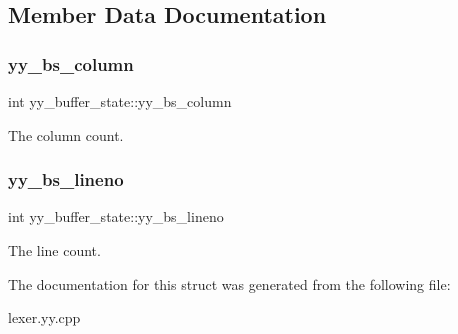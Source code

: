 \subsection{Member Data Documentation}
\mbox{\label{structyy__buffer__state_a10c4fcd8be759e6bf11e6d3e8cdb0307}} 
\subsubsection{\texorpdfstring{yy\+\_\+bs\+\_\+column}{yy\_bs\_column}}
{\footnotesize\ttfamily int yy\+\_\+buffer\+\_\+state\+::yy\+\_\+bs\+\_\+column}

The column count. \mbox{\label{structyy__buffer__state_a818e94bc9c766e683c60df1e9fd01199}} 
\subsubsection{\texorpdfstring{yy\+\_\+bs\+\_\+lineno}{yy\_bs\_lineno}}
{\footnotesize\ttfamily int yy\+\_\+buffer\+\_\+state\+::yy\+\_\+bs\+\_\+lineno}

The line count. 

The documentation for this struct was generated from the following file\+:\begin{DoxyCompactItemize}
\item 
lexer.\+yy.\+cpp\end{DoxyCompactItemize}
